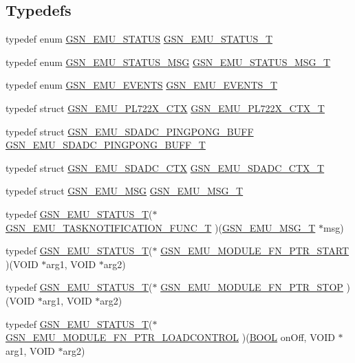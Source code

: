 \subsection*{Typedefs}
\begin{DoxyCompactItemize}
\item 
typedef enum \hyperlink{a00490_ab4db26a19622c2d88752fa95dfa482e4}{GSN\_\-EMU\_\-STATUS} \hyperlink{a00490_aeda27e2bd7f74b1b9748e313d272033e}{GSN\_\-EMU\_\-STATUS\_\-T}
\item 
typedef enum \hyperlink{a00490_af20d5f49a2180518c67918891814b64d}{GSN\_\-EMU\_\-STATUS\_\-MSG} \hyperlink{a00490_a0dc41bc6ddae5366da792644baa62929}{GSN\_\-EMU\_\-STATUS\_\-MSG\_\-T}
\item 
typedef enum \hyperlink{a00490_a160be712e5fe9a0be8527f6c7f5af417}{GSN\_\-EMU\_\-EVENTS} \hyperlink{a00490_a3102246967e310cb7dd2c39d7045da12}{GSN\_\-EMU\_\-EVENTS\_\-T}
\item 
typedef struct \hyperlink{a00065}{GSN\_\-EMU\_\-PL722X\_\-CTX} \hyperlink{a00490_a84a9841a4a843fcbb1cda688140edf07}{GSN\_\-EMU\_\-PL722X\_\-CTX\_\-T}
\item 
typedef struct \hyperlink{a00067}{GSN\_\-EMU\_\-SDADC\_\-PINGPONG\_\-BUFF} \hyperlink{a00490_a930ae11cb1c9d2d92a1e706db09effbf}{GSN\_\-EMU\_\-SDADC\_\-PINGPONG\_\-BUFF\_\-T}
\item 
typedef struct \hyperlink{a00066}{GSN\_\-EMU\_\-SDADC\_\-CTX} \hyperlink{a00490_ad44ea3676acc85a4f0a82694e977b028}{GSN\_\-EMU\_\-SDADC\_\-CTX\_\-T}
\item 
typedef struct \hyperlink{a00062}{GSN\_\-EMU\_\-MSG} \hyperlink{a00490_a4c117b843f7e47a1cffa3dbf835b5add}{GSN\_\-EMU\_\-MSG\_\-T}
\item 
typedef \hyperlink{a00490_aeda27e2bd7f74b1b9748e313d272033e}{GSN\_\-EMU\_\-STATUS\_\-T}($\ast$ \hyperlink{a00490_a05b3306759ea16994bc2d9055424367e}{GSN\_\-EMU\_\-TASKNOTIFICATION\_\-FUNC\_\-T} )(\hyperlink{a00062}{GSN\_\-EMU\_\-MSG\_\-T} $\ast$msg)
\item 
typedef \hyperlink{a00490_aeda27e2bd7f74b1b9748e313d272033e}{GSN\_\-EMU\_\-STATUS\_\-T}($\ast$ \hyperlink{a00490_ab5cebba523e2b72d76d138a05442f45f}{GSN\_\-EMU\_\-MODULE\_\-FN\_\-PTR\_\-START} )(VOID $\ast$arg1, VOID $\ast$arg2)
\item 
typedef \hyperlink{a00490_aeda27e2bd7f74b1b9748e313d272033e}{GSN\_\-EMU\_\-STATUS\_\-T}($\ast$ \hyperlink{a00490_a4f4448985a9e37498dc826597d03c746}{GSN\_\-EMU\_\-MODULE\_\-FN\_\-PTR\_\-STOP} )(VOID $\ast$arg1, VOID $\ast$arg2)
\item 
typedef \hyperlink{a00490_aeda27e2bd7f74b1b9748e313d272033e}{GSN\_\-EMU\_\-STATUS\_\-T}($\ast$ \hyperlink{a00490_a34475255b9c6517a46adea1b1cbca0bb}{GSN\_\-EMU\_\-MODULE\_\-FN\_\-PTR\_\-LOADCONTROL} )(\hyperlink{a00660_ga1f04022c0a182c51c059438790ea138c}{BOOL} onOff, VOID $\ast$arg1, VOID $\ast$arg2)

\end{DoxyCompactItemize}
